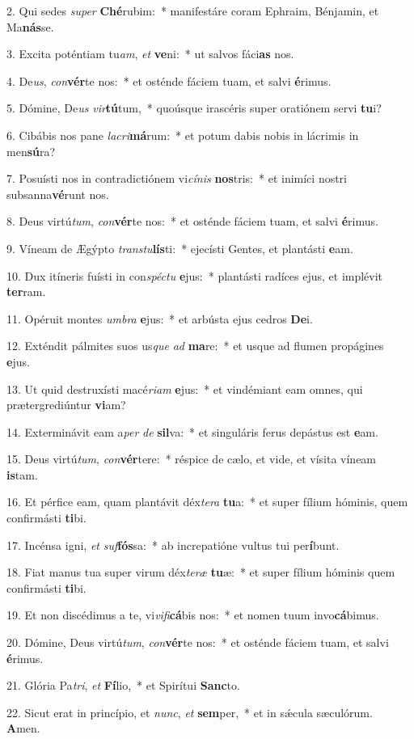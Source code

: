 2. Qui sedes \textit{su}\textit{per} \textbf{Ché}rubim:~*  manifestáre coram Ephraim, Bénjamin, et Ma\textbf{nás}se.\

3. Excita poténtiam tu\textit{am}, \textit{et} \textbf{ve}ni:~*  ut salvos fáci\textbf{as} nos.\

4. De\textit{us}, \textit{con}\textbf{vér}te nos:~*  et osténde fáciem tuam, et salvi \textbf{é}rimus.\

5. Dómine, De\textit{us} \textit{vir}\textbf{tú}tum,~*  quoúsque irascéris super oratiónem servi \textbf{tu}i?\

6. Cibábis nos pane \textit{la}\textit{cri}\textbf{má}rum:~*  et potum dabis nobis in lácrimis in men\textbf{sú}ra?\

7. Posuísti nos in contradictiónem vi\textit{cí}\textit{nis} \textbf{nos}tris:~*  et inimíci nostri subsanna\textbf{vé}runt nos.\

8. Deus virtú\textit{tum}, \textit{con}\textbf{vér}te nos:~*  et osténde fáciem tuam, et salvi \textbf{é}rimus.\

9. Víneam de Ægýpto \textit{trans}\textit{tu}\textbf{lís}ti:~*  ejecísti Gentes, et plantásti \textbf{e}am.\

10. Dux itíneris fuísti in con\textit{spéc}\textit{tu} \textbf{e}jus:~*  plantásti radíces ejus, et implévit \textbf{ter}ram.\

11. Opéruit montes \textit{um}\textit{bra} \textbf{e}jus:~*  et arbústa ejus cedros \textbf{De}i.\

12. Exténdit pálmites suos us\textit{que} \textit{ad} \textbf{ma}re:~*  et usque ad flumen propágines \textbf{e}jus.\

13. Ut quid destruxísti macé\textit{ri}\textit{am} \textbf{e}jus:~*  et vindémiant eam omnes, qui prætergrediúntur \textbf{vi}am?\

14. Exterminávit eam a\textit{per} \textit{de} \textbf{sil}va:~*  et singuláris ferus depástus est \textbf{e}am.\

15. Deus virtú\textit{tum}, \textit{con}\textbf{vér}tere:~*  réspice de cælo, et vide, et vísita víneam \textbf{is}tam.\

16. Et pérfice eam, quam plantávit déx\textit{te}\textit{ra} \textbf{tu}a:~*  et super fílium hóminis, quem confirmásti \textbf{ti}bi.\

17. Incénsa igni, \textit{et} \textit{suf}\textbf{fós}sa:~*  ab increpatióne vultus tui per\textbf{í}bunt.\

18. Fiat manus tua super virum déx\textit{te}\textit{ræ} \textbf{tu}æ:~*  et super fílium hóminis quem confirmásti \textbf{ti}bi.\

19. Et non discédimus a te, vi\textit{vi}\textit{fi}\textbf{cá}bis nos:~*  et nomen tuum invo\textbf{cá}bimus.\

20. Dómine, Deus virtú\textit{tum}, \textit{con}\textbf{vér}te nos:~*  et osténde fáciem tuam, et salvi \textbf{é}rimus.\

21. Glória Pa\textit{tri}, \textit{et} \textbf{Fí}lio,~*  et Spirítui \textbf{Sanc}to.\

22. Sicut erat in princípio, et \textit{nunc}, \textit{et} \textbf{sem}per,~*  et in sǽcula sæculórum. \textbf{A}men.\

